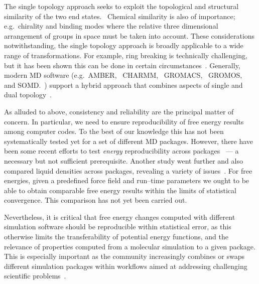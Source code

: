 \documentclass[journal=jctcce,manuscript=article]{achemso}
\begin{document}
The single topology approach seeks to exploit the
topological and structural similarity of the two end states.~\cite{doi:10.1021/j100056a020}
Chemical similarity is also of
importance; e.g.\ chirality and binding modes where the relative three
dimensional arrangement of groups in space must be taken into account.
These considerations notwithstanding, the single topology approach is broadly applicable to a wide range of transformations.
For example, ring breaking is technically
challenging,~\cite{doi:10.1021/acs.jctc.6b00991} but it has been
shown this can be done in certain
circumstances~\cite{doi:10.1021/acs.jcim.5b00057,
  doi:10.1021/jp994193s}.
Generally, modern MD software (e.g.\ AMBER,~\cite{case_amber_2005}
CHARMM,~\cite{JCC:JCC21287} GROMACS,~\cite{Abraham201519}
GROMOS,~\cite{doi:10.1021/jp984217f} and SOMD.~\cite{Sire-2016,
  doi:10.1021/ct300857j}) support a hybrid approach that combines aspects of single and dual topology~\cite{doi:10.1021/jp994193s}.


As alluded to above, consistency and reliability are the principal matter of concern.
In particular, we need to ensure reproducibility of free energy results
among computer codes.  To the best of our knowledge this has not been
systematically tested yet for a set of different MD packages.
However, there have been some recent efforts to test \emph{energy}
reproducibility across packages~\cite{Shirts2017} --- a necessary but not
sufficient prerequisite.  Another study went further and also compared liquid
densities across packages, revealing a variety of
issues~\cite{doi:10.1021/acs.jctc.7b00489}.
For free energies, given a predefined force field and run--time
parameters we ought to be able to obtain comparable free energy
results within the limits of statistical convergence.  This comparison
has not yet been carried out.

Nevertheless, it is critical that free energy
changes computed with different simulation software should be reproducible
within statistical error, as this otherwise limits the transferability of
potential energy functions, and the relevance of properties computed from a molecular simulation to a given package.  This is especially important as the community
increasingly combines or swaps different simulation packages within workflows
aimed at addressing challenging scientific
problems~\cite{Pronk:2011:CNP:2063384.2063465, doi:10.1021/ci8000937,
doi:10.1021/jp505332p, loeffler_fesetup:_2015,
DBLP:journals/corr/Balasubramanian16g}.
\end{document}
